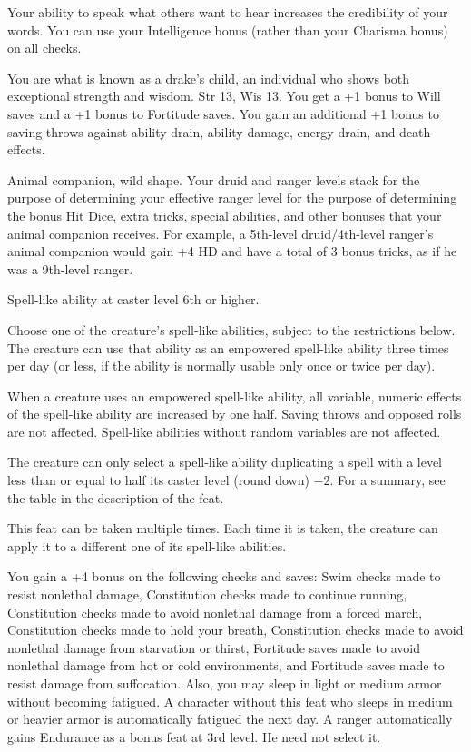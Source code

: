 {Your ability to speak what others want to hear increases the credibility of your words.}
{}
{You can use your Intelligence bonus (rather than your Charisma bonus) on all  checks.}
{}{}

{You are what is known as a drake's child, an individual who shows both exceptional strength and wisdom.}
{Str 13, Wis 13.}
{You get a +1 bonus to Will saves and a +1 bonus to Fortitude saves. You gain an additional +1 bonus to saving throws against ability drain, ability damage, energy drain, and death effects.}
{}{}

{Animal companion, wild shape.}
{
Your druid and ranger levels stack for the purpose of determining your effective ranger level for the purpose of determining the bonus Hit Dice, extra tricks, special abilities, and other bonuses that your animal companion receives. For example, a 5th-level druid/4th-level ranger's animal companion would gain +4 HD and have a total of 3 bonus tricks, as if he was a 9th-level ranger.
}

{}
{Spell-like ability at caster level 6th or higher.}
{Choose one of the creature's spell-like abilities, subject to the restrictions below. The creature can use that ability as an empowered spell-like ability three times per day (or less, if the ability is normally usable only once or twice per day).

When a creature uses an empowered spell-like ability, all variable, numeric effects of the spell-like ability are increased by one half. Saving throws and opposed rolls are not affected. Spell-like abilities without random variables are not affected.

The creature can only select a spell-like ability duplicating a spell with a level less than or equal to half its caster level (round down) $-2$. For a summary, see the table in the description of the  feat.}
{}
{This feat can be taken multiple times. Each time it is taken, the creature can apply it to a different one of its spell-like abilities.}

{}
{You gain a +4 bonus on the following checks and saves: Swim checks made to resist nonlethal damage, Constitution checks made to continue running, Constitution checks made to avoid nonlethal damage from a forced march, Constitution checks made to hold your breath, Constitution checks made to avoid nonlethal damage from starvation or thirst, Fortitude saves made to avoid nonlethal damage from hot or cold environments, and Fortitude saves made to resist damage from suffocation. Also, you may sleep in light or medium armor without becoming fatigued.}
{A character without this feat who sleeps in medium or heavier armor is automatically fatigued the next day.}{}
{A ranger automatically gains Endurance as a bonus feat at 3rd level. He need not select it.}

